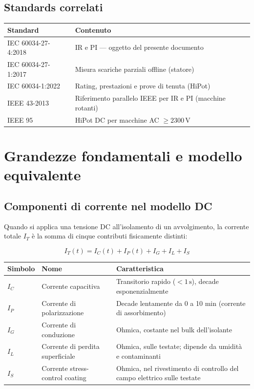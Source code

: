 \documentclass[a4paper,11pt]{article}
\begin{document}
\subsection{Standards correlati}

\begin{center}
\begin{tabularx}{\linewidth}{lX}
\toprule
\textbf{Standard} & \textbf{Contenuto} \\
\midrule
IEC 60034-27-4:2018 & IR e PI — oggetto del presente documento \\
IEC 60034-27-1:2017 & Misura scariche parziali offline (statore) \\
IEC 60034-1:2022 & Rating, prestazioni e prove di tenuta (HiPot) \\
IEEE 43-2013       & Riferimento parallelo IEEE per IR e PI (macchine rotanti) \\
IEEE 95            & HiPot DC per macchine AC $\geq 2300\,\text{V}$ \\
\bottomrule
\end{tabularx}
\end{center}

\section{Grandezze fondamentali e modello equivalente}

\subsection{Componenti di corrente nel modello DC}

Quando si applica una tensione DC all'isolamento di un avvolgimento, la corrente totale $I_T$ è la somma di cinque contributi fisicamente distinti:

\begin{equation}
  I_T(t) = I_C(t) + I_P(t) + I_G + I_L + I_S
\end{equation}

\begin{center}
\begin{tabularx}{\linewidth}{llX}
\toprule
\textbf{Simbolo} & \textbf{Nome} & \textbf{Caratteristica} \\
\midrule
$I_C$ & Corrente capacitiva       & Transitorio rapido ($<1\,\text{s}$), decade esponenzialmente \\
$I_P$ & Corrente di polarizzazione & Decade lentamente da 0 a 10 min (corrente di assorbimento) \\
$I_G$ & Corrente di conduzione     & Ohmica, costante nel bulk dell'isolante \\
$I_L$ & Corrente di perdita superficiale & Ohmica, sulle testate; dipende da umidità e contaminanti \\
$I_S$ & Corrente stress-control coating & Ohmica, nel rivestimento di controllo del campo elettrico sulle testate \\
\bottomrule
\end{tabularx}
\end{center}
\end{document}
